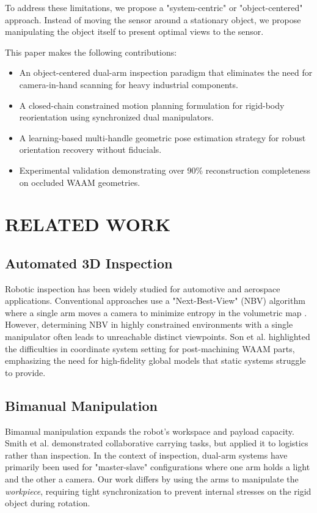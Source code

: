 \documentclass[letterpaper, 10 pt, conference]{ieeeconf}  %
\begin{document}
To address these limitations, we propose a "system-centric" or "object-centered" approach. Instead of moving the sensor around a stationary object, we propose manipulating the object itself to present optimal views to the sensor.

This paper makes the following contributions:

\begin{itemize}
    \item An object-centered dual-arm inspection paradigm that eliminates
    the need for camera-in-hand scanning for heavy industrial components.
    \item A closed-chain constrained motion planning formulation for
    rigid-body reorientation using synchronized dual manipulators.
    \item A learning-based multi-handle geometric pose estimation
    strategy for robust orientation recovery without fiducials.
    \item Experimental validation demonstrating over 90\% reconstruction
    completeness on occluded WAAM geometries.
\end{itemize}

\section{RELATED WORK}

\subsection{Automated 3D Inspection}
Robotic inspection has been widely studied for automotive and aerospace applications. Conventional approaches use a "Next-Best-View" (NBV) algorithm where a single arm moves a camera to minimize entropy in the volumetric map \cite{son2024coordinate}. However, determining NBV in highly constrained environments with a single manipulator often leads to unreachable distinct viewpoints. Son et al. \cite{son2024coordinate} highlighted the difficulties in coordinate system setting for post-machining WAAM parts, emphasizing the need for high-fidelity global models that static systems struggle to provide.

\subsection{Bimanual Manipulation}
Bimanual manipulation expands the robot's workspace and payload capacity. Smith et al. demonstrated collaborative carrying tasks, but applied it to logistics rather than inspection. In the context of inspection, dual-arm systems have primarily been used for "master-slave" configurations where one arm holds a light and the other a camera. Our work differs by using the arms to manipulate the \textit{workpiece}, requiring tight synchronization to prevent internal stresses on the rigid object during rotation.
\end{document}
